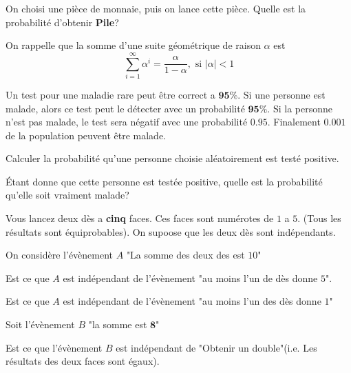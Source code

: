 \documentclass[11pt,largemargins]{homework}
\begin{document}
\begin{arabicparts}
    \item On choisi une pièce de monnaie, puis on lance cette pièce. Quelle est
        la probabilité d'obtenir \textbf{Pile}?


        On rappelle que la somme d'une suite géométrique de raison $\alpha$ est 
        \begin{equation*}
            \sum_{i=1}^\infty \alpha^i = \frac{\alpha}{1 - \alpha}, \text{ si }
            \vert \alpha \vert < 1
        \end{equation*}
\end{arabicparts}
Un test pour une maladie rare peut être correct a $\mathbf{95\%}$. Si une personne est
malade, alors ce test peut le détecter  avec un probabilité $\mathbf{95\%}$. Si
la personne n'est pas malade, le test sera négatif avec une probabilité
$\mathbf{0.95}$. Finalement $\mathbf{0.001}$ de la population peuvent être malade.

\begin{arabicparts}
    \item Calculer la probabilité qu'une personne  choisie aléatoirement est testé positive.
    \item Étant donne que cette personne est testée positive, quelle est la
        probabilité qu'elle soit vraiment malade?
\end{arabicparts}

Vous lancez deux dès a \textbf{cinq} faces. Ces faces sont numérotes de $1$ a
$5$. (Tous les résultats sont équiprobables). On supoose que les deux dès sont
indépendants.

\begin{arabicparts}
    \item On considère l'évènement $A$ "La somme des deux des est $10$"
        \begin{arabicparts}
            \item Est ce que $A$ est indépendant de l'évènement "au moins l'un
                de dès donne $5$".
            \item Est ce que $A$ est indépendant de l'évènement "au moins l'un
                des dès donne $1$"
        \end{arabicparts}
    \item Soit l'évènement $B$ "la somme est $\mathbf{8}$"
        \begin{arabicparts}
            \item Est ce que l'évènement $B$ est indépendant de "Obtenir un
                double"(i.e. Les résultats des deux faces sont égaux).
        \end{arabicparts}

\end{arabicparts}
\end{document}
